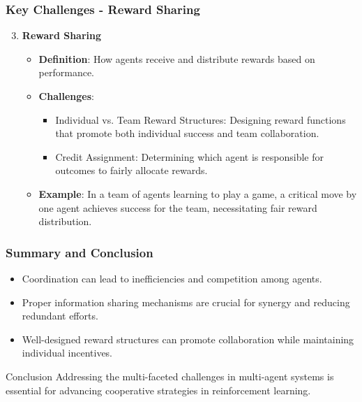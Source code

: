 \documentclass[aspectratio=169]{beamer}
\begin{document}
\begin{frame}[fragile]
    \frametitle{Key Challenges - Reward Sharing}
    \begin{enumerate}
        \setcounter{enumi}{2}
        \item \textbf{Reward Sharing}
        \begin{itemize}
            \item \textbf{Definition}: How agents receive and distribute rewards based on performance.
            \item \textbf{Challenges}:
            \begin{itemize}
                \item Individual vs. Team Reward Structures: Designing reward functions that promote both individual success and team collaboration.
                \item Credit Assignment: Determining which agent is responsible for outcomes to fairly allocate rewards.
            \end{itemize}
            \item \textbf{Example}: In a team of agents learning to play a game, a critical move by one agent achieves success for the team, necessitating fair reward distribution.
        \end{itemize}
    \end{enumerate}
\end{frame}

\begin{frame}[fragile]
    \frametitle{Summary and Conclusion}
    \begin{itemize}
        \item Coordination can lead to inefficiencies and competition among agents.
        \item Proper information sharing mechanisms are crucial for synergy and reducing redundant efforts.
        \item Well-designed reward structures can promote collaboration while maintaining individual incentives.
    \end{itemize}
    
    \begin{block}{Conclusion}
        Addressing the multi-faceted challenges in multi-agent systems is essential for advancing cooperative strategies in reinforcement learning.
    \end{block}
\end{frame}
\end{document}
